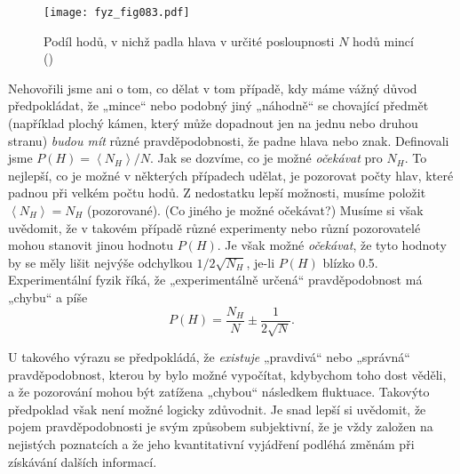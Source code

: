     \begin{figure}[ht!]  %
      \centering
      \texttt{[image: fyz\_fig083.pdf]}
      \caption{Podíl hodů, v nichž padla hlava v určité posloupnosti \(N\) hodů mincí  
               (\cite[s.~85]{Feynman01})}
      \label{fyz:fig083}
    \end{figure}
    
    Nehovořili jsme ani o tom, co dělat v tom případě, kdy máme vážný důvod předpokládat, že 
    „mince“ nebo podobný jiný „náhodně“ se chovající předmět (například plochý kámen, který může 
    dopadnout jen na jednu nebo druhou stranu) \emph{budou mít} různé pravděpodobnosti, že padne 
    hlava nebo znak. Definovali jsme \(P(H) =\left\langle N_H\right\rangle/N\). Jak se dozvíme, co 
    je možné \emph{očekávat} pro \(N_H\). To nejlepší, co je možné v některých případech udělat, je 
    pozorovat počty hlav, které padnou při velkém počtu hodů. Z nedostatku lepší možnosti, musíme 
    položit \(\left\langle N_H\right\rangle = N_H\) (pozorované). (Co jiného je možné očekávat?) 
    Musíme si však uvědomit, že v takovém případě různé experimenty nebo různí pozorovatelé mohou 
    stanovit jinou hodnotu \(P(H)\). Je však možné \emph{očekávat}, že tyto hodnoty by se měly 
    lišit nejvýše odchylkou \(1/2\sqrt{N_H}\), je-li \(P(H)\) blízko \num{0.5}. Experimentální 
    fyzik říká, že „experimentálně určená“ pravděpodobnost má „chybu“ a píše
    \begin{equation}\label{fyz:eq085}
      P(H) = \frac{N_H}{N}\pm\frac{1}{2\sqrt{N}}.
    \end{equation}
    
    U takového výrazu se předpokládá, že \emph{existuje} „pravdivá“ nebo „správná“ pravděpodobnost, 
    kterou by bylo možné vypočítat, kdybychom toho dost věděli, a že pozorování mohou být zatížena 
    „chybou“ následkem fluktuace. Takovýto předpoklad však není možné logicky zdůvodnit. Je snad 
    lepší si uvědomit, že pojem pravděpodobnosti je svým způsobem subjektivní, že je vždy založen 
    na nejistých poznatcích a že jeho kvantitativní vyjádření podléhá změnám při získávání dalších 
    informací.
        
